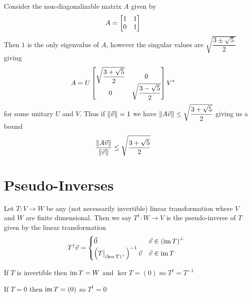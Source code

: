 \begin{defexample}
  Consider the non-diagonalizable matrix $A$ given by
    \begin{align}
      A &= \begin{bmatrix} 1 & 1 \\ 0 & 1 \end{bmatrix}
    \end{align}
  Then $1$ is the only eigenvalue of $A$, however the singular values are $\sqrt{\dfrac{3\pm\sqrt5}{2}}$ giving
    \begin{align}
      A &= U\begin{bmatrix}
        \sqrt{\dfrac{3+\sqrt5}{2}} & 0 \\
        0 & \sqrt{\dfrac{3-\sqrt5}{2}}
      \end{bmatrix}V^*
    \end{align}
  for some unitary $U$ and $V$. Thus if $\left\lVert\vec v\right\rVert = 1$ we have $\left\lVert A\vec v\right\rVert \le \sqrt{\dfrac{3+\sqrt5}{2}}$ giving us a bound
    \begin{align}
      \frac{\left\lVert A\vec v\right\rVert}{\left\lVert\vec v\right\rVert} &\le \sqrt{\dfrac{3+\sqrt5}{2}}
    \end{align}
\end{defexample}

\section{Pseudo-Inverses}

\begin{definition}
  Let $T : V \to W$ be any (not necessarily invertible) linear transformation where $V$ and $W$ are finite dimensional.
  Then we say $T^\dagger : W \to V$ is the pseudo-inverse of $T$ given by the linear transformation
    \begin{align}
      T^\dagger \vec v = \begin{cases}
        \vec 0 & \vec v \in \left(\operatorname{im} T\right)^\perp \\
        \left(T\big\rvert_{\left(\ker T\right)^\perp}\right)^{-1}\vec v & \vec v \in \operatorname{im} T
      \end{cases}
    \end{align}
\end{definition}

\begin{defexample}
  If $T$ is invertible then $\operatorname{im} T = W$ and $\ker T = (0)$ so $T^\dagger = T^{-1}$
\end{defexample}

\begin{defexample}
  If $T = 0$ then $\operatorname{im} T = (0)$ so $T^\dagger = 0$
\end{defexample}

